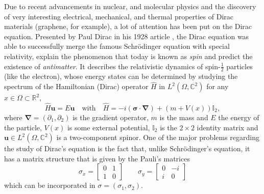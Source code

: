 Due to recent advancements in nuclear, and molecular physics and the discovery of very interesting electrical, mechanical, and thermal properties of Dirac materials (graphene, for example), a lot of attention has been put on the Dirac equation. Presented by Paul Dirac in his 1928 article \cite{dirac1928quantum}, the Dirac equation was able to successfully merge the famous Schr\"{o}dinger equation with special relativity, explain the phenomenon that today is known as \textit{spin} and predict the existence of \textit{antimatter}.
It describes the relativistic dynamics of spin-$\frac{1}{2}$ particles (like the electron), whose energy states can be determined by studying the spectrum of the Hamiltonian (Dirac) operator \(\hat{H}\) in \(L^2(\Omega, \mathbb{C}^2)\) for any \(x \in \Omega \subset \mathbb{R}^2\),
\begin{equation}\label{dirac_eq}
    \hat{H} \mathbf{u} = E \mathbf{u} \quad \text{with} \quad \hat{H}= -i (\mathbf{\sigma} \cdot \mathbf{\nabla}) + \left(m + V(x)\right) \mathbb{I}_2,
\end{equation}
where \(\mathbf{\nabla} = (\partial_1, \partial_2) \) is the gradient operator, \(m\) is the mass and \(E\) the energy of the particle, \(V(x)\) is some external potential, \(\mathbb{I}_2\) is the \(2\times 2\) identity matrix and \(\mathbf{u} \in L^2(\Omega, \mathbb{C}^2)\) is a two-component spinor. One of the major problems regarding the study of Dirac's equation is the fact that, unlike Schr\"{o}dinger's equation, it has a matrix structure that is given by the Pauli's matrices
\[
\sigma_x = \begin{bmatrix}
    0 & 1\\
    1 & 0
\end{bmatrix} \qquad \sigma_y = \begin{bmatrix}
    0 & -i\\
    i & 0
\end{bmatrix}
\]
which can be incorporated in \(\sigma = (\sigma_1, \sigma_2)\).    

